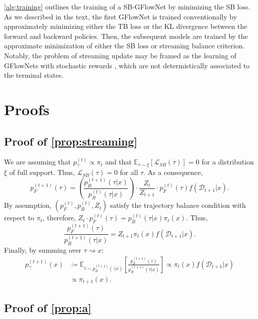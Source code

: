 \documentclass{article}
\theoremstyle{plain}
\theoremstyle{definition}
\theoremstyle{remark}
\theoremstyle{remark}
\begin{document}
\autoref{alg:training} outlines the training of a SB-GFlowNet by minimizing the SB loss. As we described in the text, the first GFlowNet is trained conventionally by approximately minimizing either the TB loss or the KL divergence between the forward and backward policies. Then, the subsequent models are trained by the approximate minimization of either the SB loss or streaming balance criterion. Notably, the problem of streaming update may be framed as the learning of GFlowNets with stochastic rewards \cite{stochastic}, which are not determistically associated to the terminal states.  

\section{Proofs} 
\label{sec:app:proofs}
\subsection{Proof of \autoref{prop:streaming}} 

We are assuming that $p_{\top}^{(t)}  \propto \pi_{t}$ and that $\mathbb{E}_{\tau \sim \xi}[\mathcal{L}_{SB}(\tau)] = 0$ for a distribution $\xi$ of full support. Thus, $\mathcal{L}_{SB}(\tau) = 0$ for all $\tau$. As a consequence,
\begin{equation}
    p_{F}^{(t + 1)}(\tau) = \left( \frac{p_{B}^{(t + 1)}(\tau | x)}{p_{B}^{(t)}(\tau | x)}  \right) \cdot \frac{Z_{t}}{Z_{t+1}} \cdot  p_{F}^{(t)}(\tau) f(\mathcal{D}_{t + 1} | x). 
\end{equation}
By assumption, $(p_{F}^{(t)}, p_{B}^{(t)}, Z_{t})$ satisfy the trajectory balance condition with respect to $\pi_{t}$, therefore, $Z_t\cdot p_F^{(t)}(\tau) = p_B^{(t)}(\tau|x)\pi_t(x)$. Thus, 
\begin{equation}
    \frac{p_{F}^{(t + 1)}(\tau)}{p_{B}^{(t + 1)}(\tau | x)} = Z_{t + 1} \pi_{t}(x) f(\mathcal{D}_{t + 1} | x).
\end{equation}
Finally, by summing over $\tau \rightsquigarrow x$:
\begin{align}
    p_{\top}^{(t + 1)}(x)
    &\coloneqq \mathbb{E}_{\tau \sim p_{B}^{(t + 1)}(\cdot | x)}\left[\frac{p_{F}^{(t + 1)}(\tau)}{p_{B}^{(t + 1)}(\tau | x)}\right]
    \propto \pi_{t}(x) f(\mathcal{D}_{t + 1} | x)\\
    &\propto \pi_{t + 1}(x).
\end{align}

\subsection{Proof of \autoref{prop:a}} 
\end{document}

